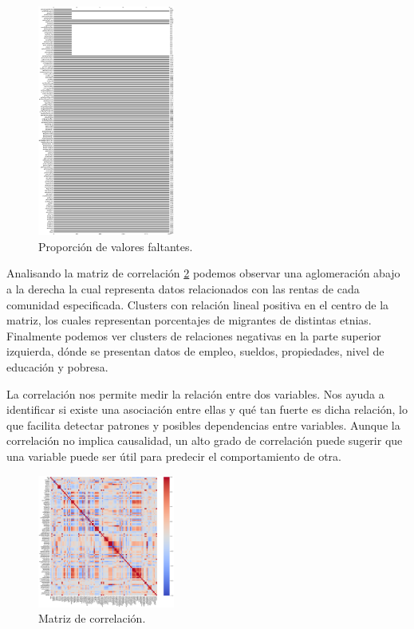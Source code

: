 \documentclass[twocolumn]{article}
\begin{document}
\begin{figure}[!h]
\centering
\includegraphics[width=0.4\textwidth]{assets/missing.png}
\caption{\label{fig:missing}Proporción de valores faltantes.}
\end{figure}

Analisando la matriz de correlación \ref{fig:corr} podemos observar una 
aglomeración abajo a la derecha la cual representa datos relacionados con las 
rentas de cada comunidad especificada. Clusters con relación lineal positiva
en el centro de la matriz, los cuales representan porcentajes de migrantes
de distintas etnias. Finalmente podemos ver clusters de relaciones negativas
en la parte superior izquierda, dónde se presentan datos de empleo, sueldos,
propiedades, nivel de educación y pobresa.

La correlación nos permite medir la relación entre dos variables. Nos ayuda a identificar si 
existe una asociación entre ellas y qué tan fuerte es dicha relación, lo que facilita 
detectar patrones y posibles dependencias entre variables. 
Aunque la correlación no implica causalidad, un alto grado de correlación puede 
sugerir que una variable puede ser útil para predecir el comportamiento de otra. 

\begin{figure}[!ht]
\centering
\includegraphics[width=0.4\textwidth]{assets/corr.png}
\caption{Matriz de correlación.}
\label{fig:corr}
\end{figure}
\end{document}
